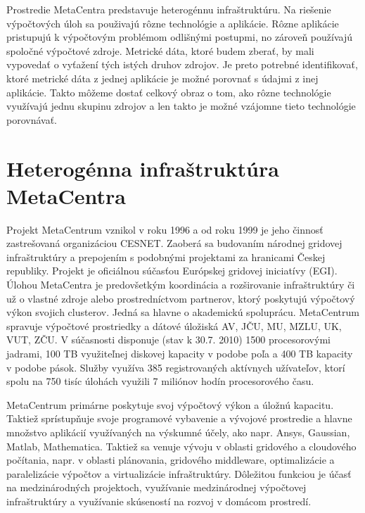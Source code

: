 \documentclass[12pt,twoside,color,cover,table]{fithesis3}
\begin{document}
Prostredie MetaCentra predstavuje heterogénnu infraštruktúru. Na riešenie výpočtových úloh sa použivajú rôzne technológie a aplikácie. Rôzne aplikácie pristupujú k výpočtovým problémom odlišnými postupmi,
no zároveň používajú spoločné výpočtové zdroje. Metrické dáta, ktoré budem zberať, by mali vypovedať o vyťažení tých istých druhov zdrojov. Je preto potrebné identifikovať, ktoré metrické dáta z 
jednej aplikácie je možné porovnať s údajmi z inej aplikácie. Takto môžeme dostať celkový obraz o tom, ako rôzne technológie využívajú jednu skupinu zdrojov a len takto je možné vzájomne tieto technológie 
porovnávať. 


\chapter{Heterogénna infraštruktúra MetaCentra}
Projekt MetaCentrum vznikol v roku 1996 a od roku 1999 je jeho činnosť zastrešovaná organizáciou CESNET. Zaoberá sa budovaním národnej gridovej infraštruktúry a prepojením s podobnými projektami za hranicami
Českej republiky. Projekt je oficiálnou súčasťou Európskej gridovej iniciatívy (EGI). Úlohou MetaCentra je predovšetkým koordinácia a rozširovanie infraštruktúry či už o vlastné zdroje alebo prostredníctvom
partnerov, ktorý poskytujú výpočtový výkon svojich clusterov. Jedná sa hlavne o akademickú spoluprácu. MetaCentrum spravuje výpočtové prostriedky a dátové úložiská AV, JČU, MU, MZLU, UK, VUT, ZČU.
V súčasnosti disponuje (stav k 30.7. 2010) 1500 procesorovými jadrami, 100 TB využiteľnej diskovej kapacity v podobe poľa a 400 TB kapacity v podobe pások. Služby využíva 385 registrovaných aktívnych užívateľov, ktorí 
spolu na 750 tisíc úlohách využili 7 miliónov hodín procesorového času.

MetaCentrum primárne poskytuje svoj výpočtový výkon a úložnú kapacitu. Taktiež sprístupňuje svoje programové vybavenie a vývojové prostredie a hlavne množstvo aplikácií využívaných na výskumné účely, ako napr. 
Ansys, Gaussian, Matlab, Mathematica. Taktiež sa venuje vývoju v oblasti gridového a cloudového počítania, napr. v oblasti plánovania, gridového middleware, optimalizácie a paralelizácie výpočtov a virtualizácie
infraštruktúry. Dôležitou funkciou je účasť na medzinárodných projektoch, využívanie medzinárodnej výpočtovej infraštruktúry a využívanie skúseností na rozvoj v domácom prostredí.%
\end{document}
